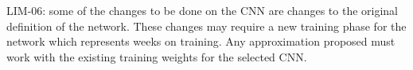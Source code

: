 LIM-06: some of the changes to be done on the CNN are changes to the original definition of the network.
These changes may require a new training phase for the network which represents weeks on training.
Any approximation proposed must work with the existing training weights for the selected CNN.



            

